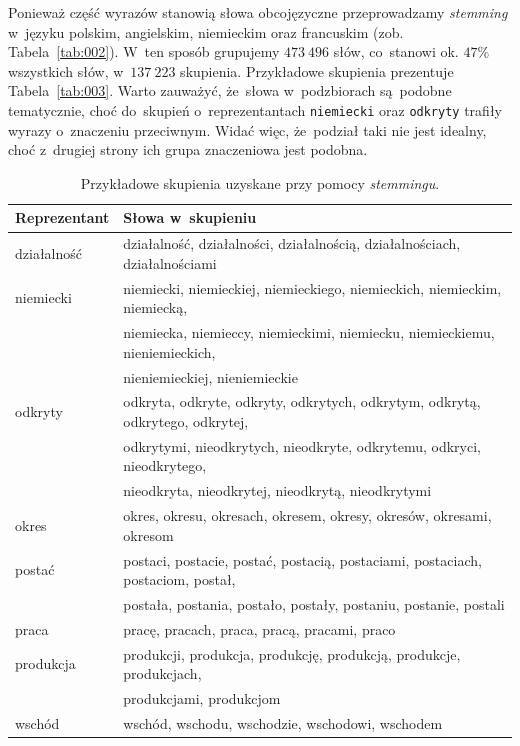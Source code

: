 \documentclass{praca1}
\begin{document}
Ponieważ część wyrazów stanowią słowa obcojęzyczne przeprowadzamy \emph{stemming} w~języku polskim, angielskim, niemieckim oraz francuskim (zob. Tabela~\ref{tab:002}). W~ten sposób grupujemy $473\ 496$ słów, co~stanowi ok. $47\%$ wszystkich słów, w~$137\ 223$ skupienia. Przykładowe skupienia prezentuje Tabela~\ref{tab:003}. Warto zauważyć, że~słowa w~podzbiorach są~podobne tematycznie, choć do~skupień o~reprezentantach \verb|niemiecki| oraz \verb|odkryty| trafiły wyrazy o~znaczeniu przeciwnym. Widać więc, że~podział taki nie jest idealny, choć z~drugiej strony ich grupa znaczeniowa jest podobna. 
\vspace*{-0.5cm}
\begin{table}[h]
\centering
\caption{Przykładowe skupienia uzyskane przy pomocy \emph{stemmingu}.} \smallskip
\begin{tabular}{|l|l|}
  \hline
Reprezentant & Słowa w~skupieniu \\ \hline
  \hline
działalność & działalność, działalności, działalnością, działalnościach, działalnościami \\ 
   \hline
niemiecki & niemiecki, niemieckiej, niemieckiego, niemieckich, niemieckim, niemiecką, \\ & niemiecka, niemieccy, niemieckimi, niemiecku, niemieckiemu, nieniemieckich, \\ & nieniemieckiej, nieniemieckie \\ 
   \hline
odkryty & odkryta, odkryte, odkryty, odkrytych, odkrytym, odkrytą, odkrytego, odkrytej, \\ & odkrytymi,  nieodkrytych, nieodkryte, odkrytemu, odkryci, nieodkrytego,  \\ & nieodkryta,  nieodkrytej, nieodkrytą, nieodkrytymi \\ 
   \hline
okres & okres, okresu, okresach, okresem, okresy, okresów, okresami, okresom \\ 
   \hline
postać & postaci, postacie, postać, postacią, postaciami, postaciach, postaciom, postał, \\ &  postała, postania, postało, postały, postaniu, postanie, postali \\ 
   \hline
praca & pracę, pracach, praca, pracą, pracami, praco \\ 
   \hline
produkcja & produkcji, produkcja, produkcję, produkcją, produkcje, produkcjach, \\ &  produkcjami, produkcjom \\ 
   \hline
wschód & wschód, wschodu, wschodzie, wschodowi, wschodem \\ 

\end{tabular}
\end{table}
\end{document}
